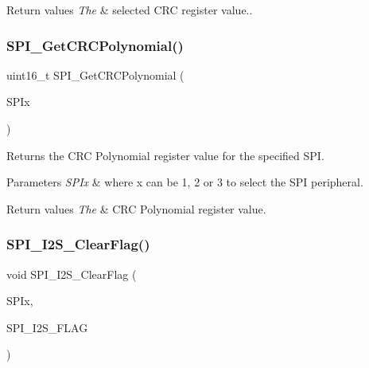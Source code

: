 \begin{DoxyRetVals}{Return values}
{\em The} & selected C\+RC register value.. \\
\hline
\end{DoxyRetVals}
\mbox{\label{group___s_p_i___private___functions_ga80fb9374cfce670f29128bb78568353f}} 
\subsubsection{\texorpdfstring{SPI\_GetCRCPolynomial()}{SPI\_GetCRCPolynomial()}}
{\footnotesize\ttfamily uint16\+\_\+t S\+P\+I\+\_\+\+Get\+C\+R\+C\+Polynomial (\begin{DoxyParamCaption}\item[{\mbox{\hyperlink{struct_s_p_i___type_def}{S\+P\+I\+\_\+\+Type\+Def}} $\ast$}]{S\+P\+Ix }\end{DoxyParamCaption})}



Returns the C\+RC Polynomial register value for the specified S\+PI. 


\begin{DoxyParams}{Parameters}
{\em S\+P\+Ix} & where x can be 1, 2 or 3 to select the S\+PI peripheral. \\
\hline
\end{DoxyParams}

\begin{DoxyRetVals}{Return values}
{\em The} & C\+RC Polynomial register value. \\
\hline
\end{DoxyRetVals}
\mbox{\label{group___s_p_i___private___functions_ga3aabd9e2437e213056c0ed9bdfa1a724}} 
\subsubsection{\texorpdfstring{SPI\_I2S\_ClearFlag()}{SPI\_I2S\_ClearFlag()}}
{\footnotesize\ttfamily void S\+P\+I\+\_\+\+I2\+S\+\_\+\+Clear\+Flag (\begin{DoxyParamCaption}\item[{\mbox{\hyperlink{struct_s_p_i___type_def}{S\+P\+I\+\_\+\+Type\+Def}} $\ast$}]{S\+P\+Ix,  }\item[{uint16\+\_\+t}]{S\+P\+I\+\_\+\+I2\+S\+\_\+\+F\+L\+AG }\end{DoxyParamCaption})}



